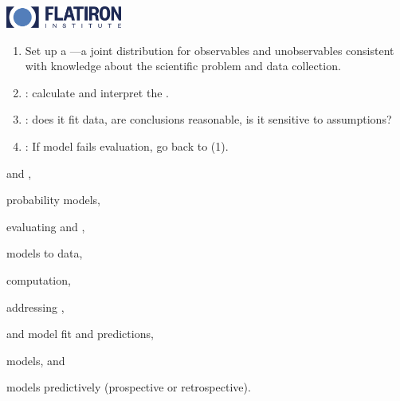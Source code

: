\documentclass[10pt]{report}
\begin{document}
\sf%
\mbox{ }
\\[12pt]
\\[4pt]
\\[24pt]
\noindent
{}
\\[4pt]
\\[2pt]
\vfill
\noindent
{} \hfill
\includegraphics[width=1.5in]{img/flatiron-logo.png}

\begin{enumerate}
    \item Set up a ---a joint
      distribution for observables and unobservables consistent with
      knowledge about the scientific problem and data collection.
    \item {}: calculate and interpret the
      .
    \item {}: does it fit
      data, are conclusions reasonable, is it sensitive to
      assumptions?
    \item {}: If model fails evaluation, go back to (1).
    \end{enumerate}
      \vfill
    
\begin{subitemize}
  \item {} and ,
  \item {} probability models,
  \item evaluating  and ,
  \item {} models to data,
  \item {} computation,
  \item addressing ,
  \item {} and  model fit and predictions,
  \item {} models, and
  \item {} models predictively (prospective or retrospective).
    \vfill
  \end{subitemize}
\end{document}
